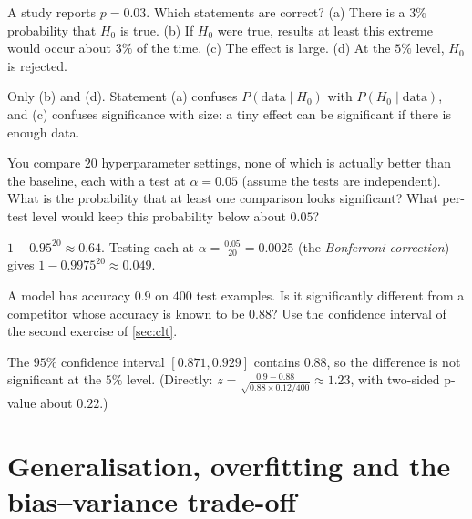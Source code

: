 \begin{exercise}
A study reports $p = 0.03$. Which statements are correct? (a) There is a $3\%$
probability that $H_0$ is true. (b) If $H_0$ were true, results at least this
extreme would occur about $3\%$ of the time. (c) The effect is large.
(d) At the $5\%$ level, $H_0$ is rejected.
\end{exercise}
\begin{solution}
Only (b) and (d). Statement (a) confuses $P(\text{data} \mid H_0)$ with
$P(H_0 \mid \text{data})$, and (c) confuses significance with size: a tiny effect
can be significant if there is enough data.
\end{solution}

\begin{exercise}
You compare $20$ hyperparameter settings, none of which is actually better than
the baseline, each with a test at $\alpha = 0.05$ (assume the tests are
independent). What is the probability that at least one comparison looks
significant? What per-test level would keep this probability below about $0.05$?
\end{exercise}
\begin{solution}
$1 - 0.95^{20} \approx 0.64$. Testing each at $\alpha = \tfrac{0.05}{20} = 0.0025$
(the \emph{Bonferroni correction}) gives $1 - 0.9975^{20} \approx 0.049$.
\end{solution}

\begin{exercise}
A model has accuracy $0.9$ on $400$ test examples. Is it significantly different
from a competitor whose accuracy is known to be $0.88$? Use the confidence
interval of the second exercise of \cref{sec:clt}.
\end{exercise}
\begin{solution}
The $95\%$ confidence interval $[0.871, 0.929]$ contains $0.88$, so the difference
is not significant at the $5\%$ level. (Directly: $z = \tfrac{0.9 -
0.88}{\sqrt{0.88\times0.12/400}} \approx 1.23$, with two-sided p-value about $0.22$.)
\end{solution}

\section{Generalisation, overfitting and the bias--variance trade-off}\label{sec:generalisation}

